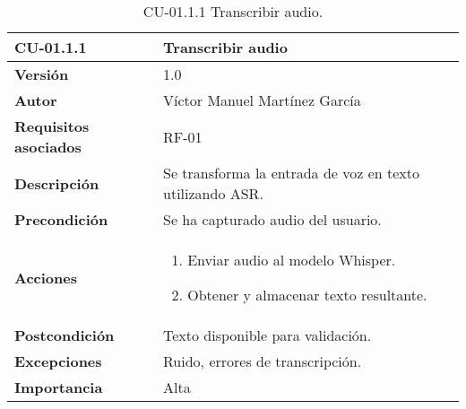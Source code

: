 \begin{table}[p]
    \centering
    \begin{tabularx}{\linewidth}{ p{} p{} }
        \toprule
        \textbf{CU-01.1.1}    & \textbf{Transcribir audio}\\
        \toprule
        \textbf{Versión}              & 1.0 \\
        \textbf{Autor}                & Víctor Manuel Martínez García \\
        \textbf{Requisitos asociados} & RF-01 \\
        \textbf{Descripción}          & Se transforma la entrada de voz en texto utilizando ASR.\\
        \textbf{Precondición}         & Se ha capturado audio del usuario.\\
        \textbf{Acciones}             &
        \begin{enumerate}
          \item Enviar audio al modelo Whisper.
          \item Obtener y almacenar texto resultante.
        \end{enumerate}\\
        \textbf{Postcondición}        & Texto disponible para validación.\\
        \textbf{Excepciones}          & Ruido, errores de transcripción.\\
        \textbf{Importancia}          & Alta \\
        \bottomrule
    \end{tabularx}
    \caption{CU-01.1.1 Transcribir audio.}
    \label{CU-01.1.1 Transcribir audio}
\end{table}

